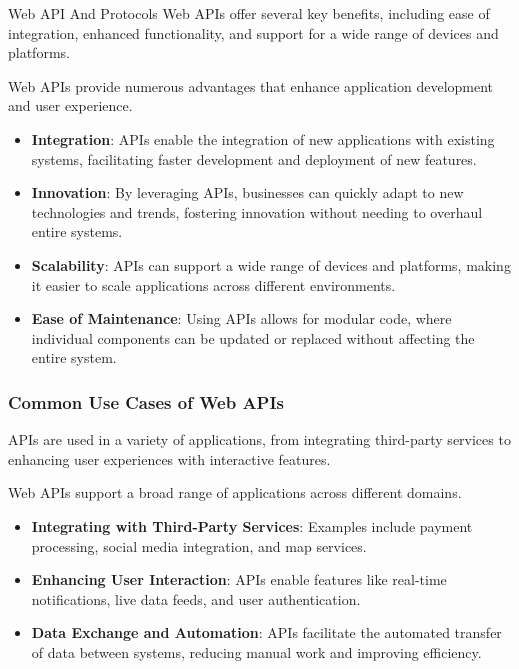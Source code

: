\begin{notes}{Web API And Protocols}
    Web APIs offer several key benefits, including ease of integration, enhanced functionality, and support for a wide range of devices and platforms.
    
    \begin{highlight}
    
        Web APIs provide numerous advantages that enhance application development and user experience.
        
        \begin{itemize}
            \item \textbf{Integration}: APIs enable the integration of new applications with existing systems, facilitating faster development and deployment of new features.
            \item \textbf{Innovation}: By leveraging APIs, businesses can quickly adapt to new technologies and trends, fostering innovation without needing to overhaul entire systems.
            \item \textbf{Scalability}: APIs can support a wide range of devices and platforms, making it easier to scale applications across different environments.
            \item \textbf{Ease of Maintenance}: Using APIs allows for modular code, where individual components can be updated or replaced without affecting the entire system.
        \end{itemize}
    
    \end{highlight}
    
    \subsubsection*{Common Use Cases of Web APIs}
    
    APIs are used in a variety of applications, from integrating third-party services to enhancing user experiences with interactive features.
    
    \begin{highlight}
    
        Web APIs support a broad range of applications across different domains.
        
        \begin{itemize}
            \item \textbf{Integrating with Third-Party Services}: Examples include payment processing, social media integration, and map services.
            \item \textbf{Enhancing User Interaction}: APIs enable features like real-time notifications, live data feeds, and user authentication.
            \item \textbf{Data Exchange and Automation}: APIs facilitate the automated transfer of data between systems, reducing manual work and improving efficiency.
        \end{itemize}
    

\end{highlight}
\end{notes}
